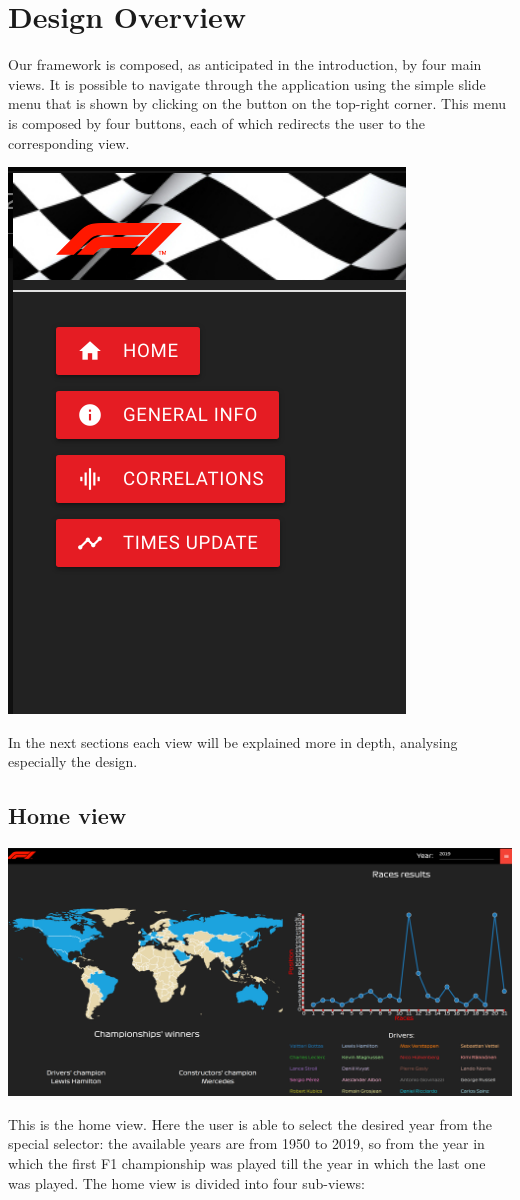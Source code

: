 \documentclass[11pt,twocolumn,letterpaper]{article}
\begin{document}
\section{Design Overview}

Our framework is composed, as anticipated in the introduction, by four main views. It is possible to navigate through the application using the simple slide menu that is shown by clicking on the button on the top-right corner. This menu is composed by four buttons, each of which redirects the user to the corresponding view.
\begin{center}
	\centering
	\includegraphics[width=0.3\columnwidth]{menu}
\end{center}
In the next sections each view will be explained more in depth, analysing especially the design.

\subsection{Home view}
\begin{center}
	\centering
	\includegraphics[width=\columnwidth]{home}
\end{center}

This is the home view. Here the user is able to select the desired year from the special selector: the available years are from 1950 to 2019, so from the year in which the first F1 championship was played till the year in which the last one was played. The home view is divided into four sub-views:
\end{document}
